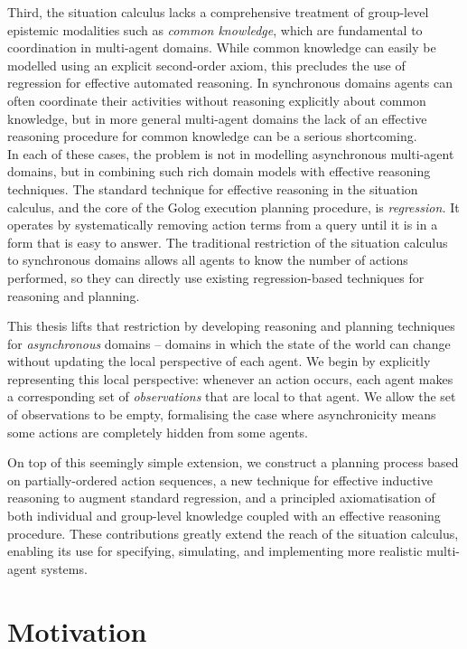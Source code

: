 Third, the situation calculus lacks a comprehensive treatment of group-level
epistemic modalities such as \emph{common knowledge}, which are fundamental
to coordination in multi-agent domains. While common knowledge can
easily be modelled using an explicit second-order axiom, this precludes
the use of regression for effective automated reasoning. In synchronous
domains agents can often coordinate their activities without reasoning
explicitly about common knowledge, but in more general multi-agent
domains the lack of an effective reasoning procedure for common knowledge
can be a serious shortcoming.\\


In each of these cases, the problem is not in modelling asynchronous
multi-agent domains, but in combining such rich domain models with
effective reasoning techniques. The standard technique for effective
reasoning in the situation calculus, and the core of the Golog execution
planning procedure, is \emph{regression.} It operates by systematically
removing action terms from a query until it is in a form that is easy
to answer. The traditional restriction of the situation calculus to
synchronous domains allows all agents to know the number of actions
performed, so they can directly use existing regression-based techniques
for reasoning and planning.

This thesis lifts that restriction by developing reasoning and planning
techniques for \emph{asynchronous} domains -- domains in which the
state of the world can change without updating the local perspective
of each agent. We begin by explicitly representing this local perspective:
whenever an action occurs, each agent makes a corresponding set of
\emph{observations} that are local to that agent. We allow the set
of observations to be empty, formalising the case where asynchronicity
means some actions are completely hidden from some agents.

On top of this seemingly simple extension, we construct a planning
process based on partially-ordered action sequences, a new technique
for effective inductive reasoning to augment standard regression,
and a principled axiomatisation of both individual and group-level
knowledge coupled with an effective reasoning procedure. These contributions
greatly extend the reach of the situation calculus, enabling its use
for specifying, simulating, and implementing more realistic multi-agent
systems.


\section{Motivation}

